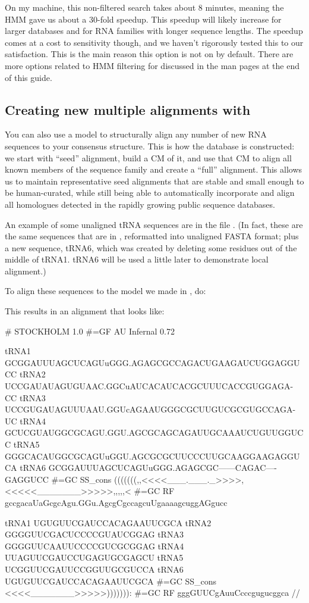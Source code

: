 On my machine, this non-filtered search takes about 8 minutes, meaning
the HMM gave us about a 30-fold speedup. This speedup will likely increase 
for larger databases and for RNA families with longer sequence
lengths. The speedup comes at a cost to sensitivity though, and we haven't
rigorously tested this to our satisfaction. This is the main reason
this option is not on by default. There are more options related to
HMM filtering for  discussed in the man pages at the
end of this guide.

\subsection{Creating new multiple alignments with }

You can also use a model to structurally align any number of new RNA
sequences to your consensus structure. This is how the 
database is constructed: we start with ``seed'' alignment, build a CM
of it, and use that CM to align all known members of the sequence
family and create a ``full'' alignment. This allows us to maintain
representative seed alignments that are stable and small enough to be
human-curated, while still being able to automatically incorporate and
align all homologues detected in the rapidly growing public sequence
databases.

An example of some unaligned tRNA sequences are in the file
. (In fact, these are the same sequences that are in
, reformatted into unaligned FASTA format; plus a
new sequence, tRNA6, which was created by deleting some residues out
of the middle of tRNA1. tRNA6 will be used a little later to
demonstrate local alignment.)

To align these sequences to the model we made in , do:


This results in an alignment that looks like:

{\samepage
\begin{sreoutput}
# STOCKHOLM 1.0
#=GF AU    Infernal 0.72

tRNA1             GCGGAUUUAGCUCAGUuGGG.AGAGCGCCAGACUGAAGAUCUGGAGGUCC
tRNA2             UCCGAUAUAGUGUAAC.GGCuAUCACAUCACGCUUUCACCGUGGAGA-CC
tRNA3             UCCGUGAUAGUUUAAU.GGUcAGAAUGGGCGCUUGUCGCGUGCCAGA-UC
tRNA4             GCUCGUAUGGCGCAGU.GGU.AGCGCAGCAGAUUGCAAAUCUGUUGGUCC
tRNA5             GGGCACAUGGCGCAGUuGGU.AGCGCGCUUCCCUUGCAAGGAAGAGGUCA
tRNA6             GCGGAUUUAGCUCAGUuGGG.AGAGCGC------CAGAC----GAGGUCC
#=GC SS_cons      (((((((,,<<<<___.___._>>>>,<<<<<_______>>>>>,,,,,<
#=GC RF           gccgacaUaGcgcAgu.GGu.AgcgCgccagcuUgaaaagcuggAGgucc

tRNA1             UGUGUUCGAUCCACAGAAUUCGCA
tRNA2             GGGGUUCGACUCCCCGUAUCGGAG
tRNA3             GGGGUUCAAUUCCCCGUCGCGGAG
tRNA4             UUAGUUCGAUCCUGAGUGCGAGCU
tRNA5             UCGGUUCGAUUCCGGUUGCGUCCA
tRNA6             UGUGUUCGAUCCACAGAAUUCGCA
#=GC SS_cons      <<<<_______>>>>>))))))):
#=GC RF           gggGUUCgAuuCcccgugucggca
//
\end{sreoutput}
}

